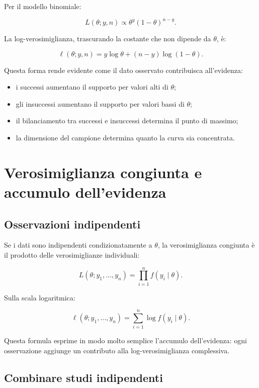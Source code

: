 \documentclass[
  italian,
  letterpaper,
  a4paper,
  11pt,
  open=any]{scrbook}
\providecommand{\tightlist}{%
  \setlength{\itemsep}{0pt}\setlength{\parskip}{0pt}}
\theoremstyle{plain}
\theoremstyle{definition}
\theoremstyle{definition}
\theoremstyle{remark}
\begin{document}
Per il modello binomiale:

\[
L(\theta; y,n) \propto \theta^y(1-\theta)^{n-y}.
\]

La log-verosimiglianza, trascurando la costante che non dipende da
\(\theta\), è:

\[
\ell(\theta; y,n)
= y\log\theta + (n-y)\log(1-\theta).
\]

Questa forma rende evidente come il dato osservato contribuisca
all'evidenza:

\begin{itemize}
\tightlist
\item
  i successi aumentano il supporto per valori alti di \(\theta\);
\item
  gli insuccessi aumentano il supporto per valori bassi di \(\theta\);
\item
  il bilanciamento tra successi e insuccessi determina il punto di
  massimo;
\item
  la dimensione del campione determina quanto la curva sia concentrata.
\end{itemize}

\section{Verosimiglianza congiunta e accumulo
dell'evidenza}\label{sec-joint-likelihood}

\subsection{Osservazioni indipendenti}\label{osservazioni-indipendenti}

Se i dati sono indipendenti condizionatamente a \(\theta\), la
verosimiglianza congiunta è il prodotto delle verosimiglianze
individuali:

\[
L(\theta; y_1, \ldots, y_n)
= \prod_{i=1}^{n} f(y_i \mid \theta).
\]

Sulla scala logaritmica:

\[
\ell(\theta; y_1, \ldots, y_n)
= \sum_{i=1}^{n}\log f(y_i \mid \theta).
\]

Questa formula esprime in modo molto semplice l'accumulo dell'evidenza:
ogni osservazione aggiunge un contributo alla log-verosimiglianza
complessiva.

\subsection{Combinare studi
indipendenti}\label{combinare-studi-indipendenti}
\end{document}
